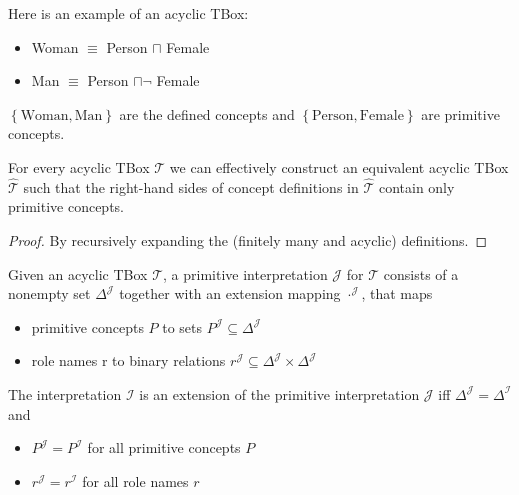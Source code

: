 \begin{example}
	Here is an example of an acyclic TBox:
	\begin{itemize}
		\item Woman $\equiv$ Person $\sqcap$ Female
		\item Man $\equiv$ Person $\sqcap \neg$ Female
	\end{itemize}
	$\left\{ \text{Woman}, \text{Man} \right\} $ are the defined concepts and $\left\{ \text{Person}, \text{Female} \right\}$ are primitive concepts.
\end{example}

\begin{prop}
	For every acyclic TBox $\mathcal{T}$ we can effectively construct an equivalent acyclic TBox $ \widehat{\mathcal{T}}$
	such that the right-hand sides of concept definitions in $\widehat{\mathcal{T}}$ contain only primitive concepts.
\end{prop}
\begin{proof}
	By recursively expanding the (finitely many and acyclic) definitions.
\end{proof}

Given an acyclic TBox $\mathcal{T}$, a primitive interpretation $\mathcal{J}$ for $\mathcal{T}$ 
consists of a nonempty set $\Delta^{\mathcal{J}}$ together with an extension mapping $\cdot^{\mathcal{J}}$, that maps
\begin{itemize}
	\item primitive concepts $P$ to sets $P^{\mathcal{J}} \subseteq \Delta^{\mathcal{J}}$ 
	\item role names r to binary relations $r^\mathcal{J} \subseteq \Delta^{\mathcal{J}} \times \Delta^{\mathcal{J}}$
\end{itemize}
The interpretation $\mathcal{I}$ is an extension of the primitive interpretation $\mathcal{J}$ iff $\Delta^{\mathcal{J}} = \Delta^{\mathcal{I}}$ and
 \begin{itemize}
	\item $P^{\mathcal{J}} = P^{\mathcal{I}}$ for all primitive concepts $P$ 
	\item $r^{\mathcal{J}} = r^{\mathcal{I}}$ for all role names $r$
\end{itemize}

